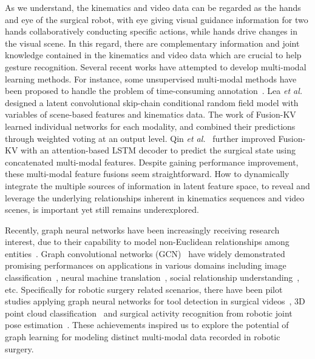 \documentclass[letterpaper, 10 pt, conference]{ieeeconf}
\begin{document}
As we understand, the kinematics and video data can be regarded as the hands and eye of the surgical robot, with eye giving visual guidance information for two hands collaboratively conducting specific actions, while hands drive changes in the visual scene.
In this regard, there are complementary information and joint knowledge contained in the kinematics and video data which are crucial to help gesture recognition.
Several recent works have attempted to develop multi-modal learning methods.
For instance, some unsupervised multi-modal methods have been proposed to handle the problem of time-consuming annotation~\cite{murali2016tsc,zhao2018fast}.
Lea \textit{et al.}~\cite{lea2016learning} designed a latent convolutional skip-chain conditional random field model with variables of scene-based features and kinematics data.
The work of Fusion-KV~\cite{qin2020temporal} learned individual networks for each modality, and combined their predictions through weighted voting at an output level. Qin \textit{et al.}~\cite{qin2020davincinet} further improved Fusion-KV with an attention-based LSTM decoder to predict the surgical state using concatenated multi-modal features.
Despite gaining performance improvement, these multi-modal feature fusions seem straightforward. How to dynamically integrate the multiple sources of information in latent feature space, to reveal and leverage the underlying relationships inherent in kinematics sequences and video scenes, is important yet still remains underexplored.

Recently, graph neural networks have been increasingly receiving research interest, due to their capability to model non-Euclidean relationships among entities~\cite{dwivedi2020benchmarkgnns,scarselli2008graph,zhou2018graph}. Graph convolutional networks (GCN)~\cite{kipf2016semi} have widely demonstrated promising performances on applications in various domains including image classification~\cite{wang2018zero}, neural machine translation~\cite{marcheggiani2018exploiting}, social relationship understanding~\cite{wang2018deep}, etc.
Specifically for robotic surgery related scenarios, there have been pilot studies applying graph neural networks for tool detection in surgical videos~\cite{wang2019graph},
3D point cloud classification~\cite{weibel2019robust,weibel2019addressing} and surgical activity recognition from robotic joint pose estimation~\cite{sarikaya2020towards}.
These achievements inspired us to explore the potential of graph learning for modeling distinct multi-modal data recorded in robotic surgery.
\end{document}
